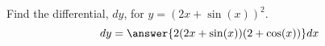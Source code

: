 \documentclass{ximera}
\author{Gregory Hartman \and Matthew Carr}
\begin{document}
\begin{exercise}




Find the differential, $dy$, for $y=(2x+\sin(x))^2$.
\[
dy=\answer{2(2x+\sin(x))(2+\cos(x))}dx
\]

\end{exercise}
\end{document}

